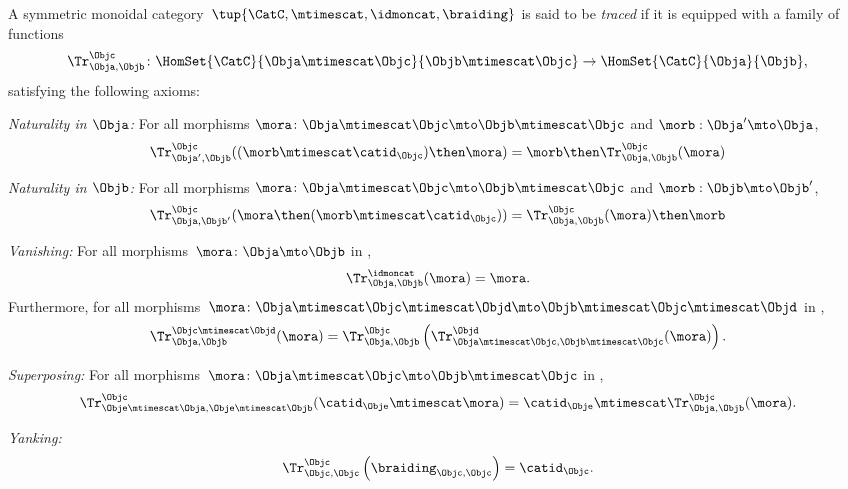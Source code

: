 \begin{ctdefinition}
    \label{def:traced-monoidal-cat}
    \label{def:traced-monoidal-category}
    A symmetric monoidal category~$\tup{\CatC,\mtimescat,\idmoncat, \braiding}$ is said to be \emph{traced} if it is equipped with a family of functions
    \begin{equation}
        \Tr_{\Obja,\Objb}^\Objc\colon \HomSet{\CatC}{\Obja \mtimescat \Objc}{\Objb\mtimescat \Objc}\to \HomSet{\CatC}{\Obja}{\Objb},
    \end{equation}
    satisfying the following axioms:
    \begin{compactenum}
        \item \emph{Naturality in $\Obja$:} For all morphisms $\mora\colon \Obja\mtimescat \Objc \mto \Objb\mtimescat \Objc$ and $\morb : \Obja' \mto \Obja$,
        \begin{equation}
            \Tr_{\Obja', \Objb}^\Objc ( (\morb \mtimescat \catid_\Objc) \then \mora) = \morb \then \Tr_{\Obja, \Objb}^\Objc (\mora)
        \end{equation}
        \item \emph{Naturality in $\Objb$:} For all morphisms $\mora\colon \Obja\mtimescat \Objc \mto \Objb\mtimescat \Objc$ and $\morb : \Objb \mto \Objb'$,
        \begin{equation}
            \Tr_{\Obja, \Objb'}^\Objc ( \mora \then (\morb \mtimescat \catid_\Objc) ) =  \Tr_{\Obja, \Objb}^\Objc (\mora) \then \morb
        \end{equation}
        \item \emph{Vanishing:} For all morphisms~$\mora \colon \Obja\mto \Objb$ in \CatC,
        \begin{equation}
            \label{eq:vanishing_1}
            \Tr_{\Obja,\Objb}^\idmoncat (\mora)=\mora.
        \end{equation}
        Furthermore, for all morphisms~$\mora \colon \Obja\mtimescat \Objc \mtimescat \Objd \mto \Objb\mtimescat \Objc \mtimescat \Objd$ in \CatC,
        \begin{equation}
            \label{eq:vanishing_2}
            \Tr_{\Obja,\Objb}^{\Objc\mtimescat \Objd}(\mora)=\Tr_{\Obja,\Objb}^\Objc\left(
            \Tr_{\Obja \mtimescat \Objc , \Objb \mtimescat \Objc}^\Objd(\mora)\right).
        \end{equation}
        \item \emph{Superposing:} For all morphisms~$\mora\colon \Obja\mtimescat \Objc \mto \Objb\mtimescat \Objc$ in \CatC,
        \begin{equation}
            \label{eq:superposing}
            \Tr_{\Obje\mtimescat \Obja,\Obje\mtimescat \Objb}^{\Objc}(\catid_\Obje\mtimescat \mora)=\catid_\Obje\mtimescat \Tr_{\Obja,\Objb}^\Objc(\mora).
        \end{equation}
        \item \emph{Yanking:}
        \begin{equation}
            \label{eq:yanking}
            \Tr_{\Objc,\Objc}^\Objc\left(\braiding_{\Objc,\Objc}\right)=\catid_\Objc.
        \end{equation}
    \end{compactenum}
\end{ctdefinition}

